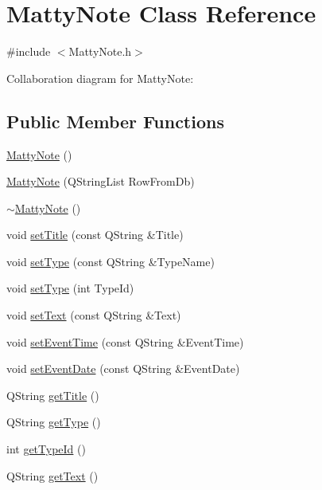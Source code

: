 \hypertarget{classMattyNote}{}\section{Matty\+Note Class Reference}
\label{classMattyNote}


{\ttfamily \#include $<$Matty\+Note.\+h$>$}



Collaboration diagram for Matty\+Note\+:
\subsection*{Public Member Functions}
\begin{DoxyCompactItemize}
\item 
\hyperlink{classMattyNote_a8c09bf366e6973bc1c4f4d5daa792899}{Matty\+Note} ()
\item 
\hyperlink{classMattyNote_a101e9c2475ee2567dfa2e168b543806f}{Matty\+Note} (Q\+String\+List Row\+From\+Db)
\item 
\hyperlink{classMattyNote_a2831641523b4a0d5c36100689f95c912}{$\sim$\+Matty\+Note} ()
\item 
void \hyperlink{classMattyNote_af7909f64608b020b501019cf29796eb0}{set\+Title} (const Q\+String \&Title)
\item 
void \hyperlink{classMattyNote_ac9171fd4faaf0c286c9315a0b4ef4560}{set\+Type} (const Q\+String \&Type\+Name)
\item 
void \hyperlink{classMattyNote_a8ae86d728b9cb64fa78042a09cb5aa70}{set\+Type} (int Type\+Id)
\item 
void \hyperlink{classMattyNote_afa0c4ee32401e4a09e8d04fd0b01da0b}{set\+Text} (const Q\+String \&Text)
\item 
void \hyperlink{classMattyNote_aaeba8670420ab9ad0fb8be660845e0ba}{set\+Event\+Time} (const Q\+String \&Event\+Time)
\item 
void \hyperlink{classMattyNote_a70676b1ab215b873c9451a82cc417684}{set\+Event\+Date} (const Q\+String \&Event\+Date)
\item 
Q\+String \hyperlink{classMattyNote_acb4af77f4177a0b17f140d4b4421e32e}{get\+Title} ()
\item 
Q\+String \hyperlink{classMattyNote_ad07b65692d79cf25e5c9008e111bd999}{get\+Type} ()
\item 
int \hyperlink{classMattyNote_af5b90028a8e406e41b8c8a6de83685ef}{get\+Type\+Id} ()
\item 
Q\+String \hyperlink{classMattyNote_a9213ac15a09625f59a95ede1b1470308}{get\+Text} ()

\end{DoxyCompactItemize}
